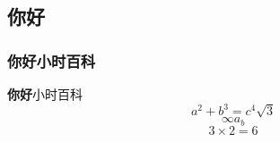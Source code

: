 
\subsection{你好}
\subsubsection{你好小时百科}
\textbf{你好}小时百科
\begin{equation}
a^2 + b^3 = c^4
\sqrt{3}
\end{equation}
\begin{equation}
\infty{a_b}
\end{equation}
\begin{equation}
3 \times 2 = 6
\end{equation}
